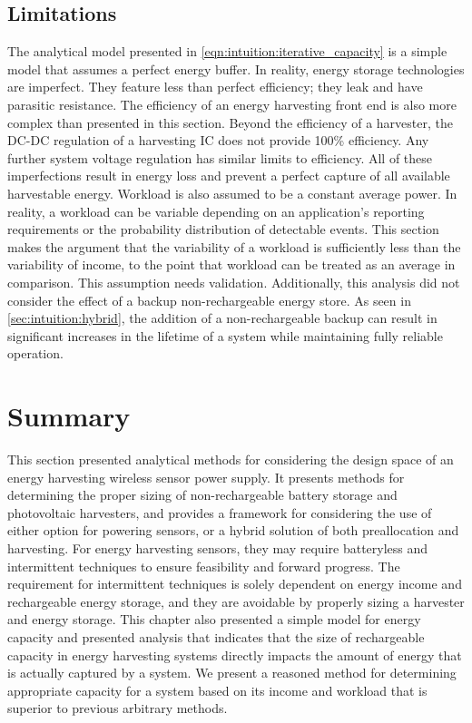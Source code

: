 \subsection{Limitations}
The analytical model presented in \cref{eqn:intuition:iterative_capacity} is a simple model that assumes a perfect energy buffer. In reality, energy storage technologies are imperfect. They feature less than perfect efficiency; they leak and have parasitic resistance. 
The efficiency of an energy harvesting front end is also more complex than presented in this section.
Beyond the efficiency of a harvester, the DC-DC regulation of a harvesting IC does not provide 100\% efficiency. 
Any further system voltage regulation has similar limits to efficiency. 
All of these imperfections result in energy loss and prevent a perfect capture of all available harvestable energy.
Workload is also assumed to be a constant average power. In reality, a workload can be variable depending on an application's reporting requirements or the probability distribution of detectable events.
This section makes the argument that the variability of a workload is sufficiently less than the variability of income, to the point that workload can be treated as an average in comparison. This assumption needs validation.
Additionally, this analysis did not consider the effect of a backup non-rechargeable energy store. As seen in \cref{sec:intuition:hybrid}, the addition of a non-rechargeable backup can result in significant increases in the lifetime of a system while maintaining fully reliable operation.


\section{Summary}
This section presented analytical methods for considering the design space of an energy harvesting wireless sensor power supply.
It presents methods for determining the proper sizing of non-rechargeable battery storage and photovoltaic harvesters, and provides a framework for considering the use of either option for powering sensors, or a hybrid solution of both preallocation and harvesting.
For energy harvesting sensors, they may require batteryless and intermittent techniques to ensure feasibility and forward progress. 
The requirement for intermittent techniques is solely dependent on energy income and rechargeable energy storage, and they are avoidable by properly sizing a harvester and energy storage.
This chapter also presented a simple model for energy capacity and presented analysis that indicates that the size of rechargeable capacity in energy harvesting systems directly impacts the amount of energy that is actually captured by a system.
We present a reasoned method for determining appropriate capacity for a system based on its income and workload that is superior to previous arbitrary methods.

